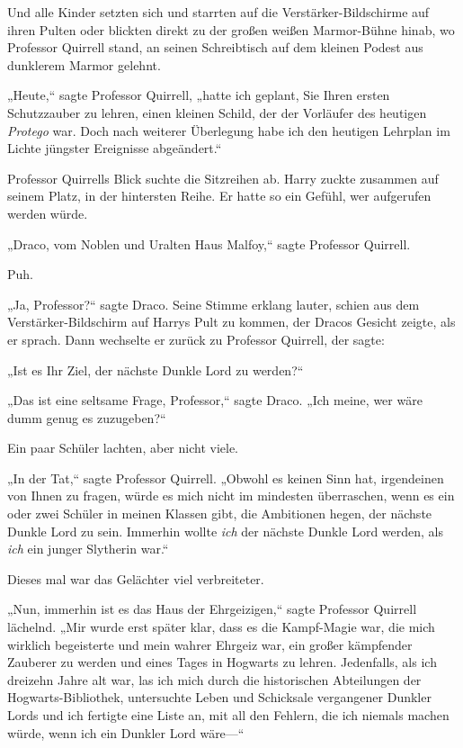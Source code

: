 {Und alle Kinder setzten sich und starrten auf die Verstärker-Bildschirme auf ihren Pulten oder blickten direkt zu der großen weißen Marmor-Bühne hinab, wo Professor Quirrell stand, an seinen Schreibtisch auf dem kleinen Podest aus dunklerem Marmor gelehnt.

„Heute,“ sagte Professor Quirrell, „hatte ich geplant, Sie Ihren ersten Schutzzauber zu lehren, einen kleinen Schild, der der Vorläufer des heutigen \emph{Protego} war. Doch nach weiterer Überlegung habe ich den heutigen Lehrplan im Lichte jüngster Ereignisse abgeändert.“

Professor Quirrells Blick suchte die Sitzreihen ab. Harry zuckte zusammen auf seinem Platz, in der hintersten Reihe. Er hatte so ein Gefühl, wer aufgerufen werden würde.

„Draco, vom Noblen und Uralten Haus Malfoy,“ sagte Professor Quirrell.

Puh.

„Ja, Professor?“ sagte Draco. Seine Stimme erklang lauter, schien aus dem Verstärker-Bildschirm auf Harrys Pult zu kommen, der Dracos Gesicht zeigte, als er sprach. Dann wechselte er zurück zu Professor Quirrell, der sagte:

„Ist es Ihr Ziel, der nächste Dunkle Lord zu werden?“

„Das ist eine seltsame Frage, Professor,“ sagte Draco. „Ich meine, wer wäre dumm genug es zuzugeben?“

Ein paar Schüler lachten, aber nicht viele.

„In der Tat,“ sagte Professor Quirrell. „Obwohl es keinen Sinn hat, irgendeinen von Ihnen zu fragen, würde es mich nicht im mindesten überraschen, wenn es ein oder zwei Schüler in meinen Klassen gibt, die Ambitionen hegen, der nächste Dunkle Lord zu sein. Immerhin wollte \emph{ich} der nächste Dunkle Lord werden, als \emph{ich} ein junger Slytherin war.“

Dieses mal war das Gelächter viel verbreiteter.

„Nun, immerhin ist es das Haus der Ehrgeizigen,“ sagte Professor Quirrell lächelnd. „Mir wurde erst später klar, dass es die Kampf-Magie war, die mich wirklich begeisterte und mein wahrer Ehrgeiz war, ein großer kämpfender Zauberer zu werden und eines Tages in Hogwarts zu lehren. Jedenfalls, als ich dreizehn Jahre alt war, las ich mich durch die historischen Abteilungen der Hogwarts-Bibliothek, untersuchte Leben und Schicksale vergangener Dunkler Lords und ich fertigte eine Liste an, mit all den Fehlern, die ich niemals machen würde, wenn ich ein Dunkler Lord wäre—“

}
